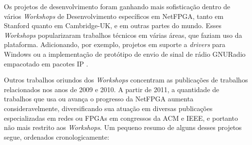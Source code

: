 Os projetos de desenvolvimento foram ganhando mais sofisticação dentro
de vários \textit{Workshops} de Desenvolvimento específicos em NetFPGA,
tanto em Stanford quanto em Cambridge-UK, e em outras partes do mundo.
Esses \textit{Workshops} popularizaram trabalhos técnicos em várias
áreas, que faziam uso da plataforma. Adicionando, por exemplo, projetos
em suporte a \textit{drivers} para Windows ou a implementação de
protótipo de envio de sinal de rádio GNURadio empacotado em pacotes IP
\cite{airnetfpga}.

Outros trabalhos oriundos dos \textit{Workshops} concentram as
publicações de trabalhos relacionados nos anos de 2009 e 2010. A partir
de 2011, a quantidade de trabalhos que usa ou avança o progresso da
NetFPGA aumenta consideravelmente, diversificando sua atuação em
diversas publicações especializadas em redes ou FPGAs em congressos da
ACM e IEEE, e portanto não mais restrito aos \textit{Workshops}. Um
pequeno resumo de alguns desses projetos segue, ordenados
cronologicamente:

